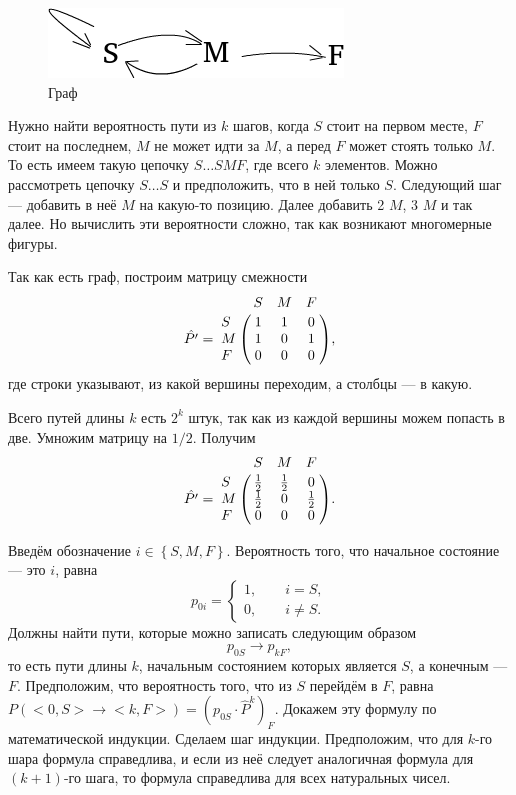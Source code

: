 \begin{figure}[h!]
  \centering
  \includegraphics[width=.6\textwidth]{./pictures/12_15.png}
  \caption{Граф}
  \label{fig:1215}
\end{figure}

Нужно найти вероятность пути из $k$ шагов, когда $S$ стоит на первом месте, $F$ стоит на последнем, $M$ не может идти за $M$, а перед $F$ может стоять только $M$.
То есть имеем такую цепочку $S \dotsc SMF$, где всего $k$ элементов.
Можно рассмотреть цепочку $S \dotsc S$ и предположить, что в ней только $S$.
Следующий шаг --- добавить в неё $M$ на какую-то позицию.
Далее добавить 2 $M$, 3 $M$ и так далее.
Но вычислить эти вероятности сложно, так как возникают многомерные фигуры.

Так как есть граф, построим матрицу смежности
$$ \hat{P'} =
\bordermatrix{~ & S & M & F \cr
              S & 1 & 1 & 0 \cr
              M & 1 & 0 & 1 \cr
	      F & 0 & 0 & 0 \cr },$$
где строки указывают, из какой вершины переходим, а столбцы --- в какую.

Всего путей длины $k$ есть $2^k$ штук, так как из каждой вершины можем попасть в две.
Умножим матрицу на $1/2$.
Получим
$$ \hat{P'} =
\bordermatrix{~ & S & M & F \cr
              S & \frac{1}{2} & \frac{1}{2} & 0 \cr
              M & \frac{1}{2} & 0 & \frac{1}{2} \cr
	      F & 0 & 0 & 0 \cr }.$$

Введём обозначение $i \in \left\{ S, M ,F \right\} $.
Вероятность того, что начальное состояние --- это $i$, равна
$$p_{0i} =
\begin{cases}
1, \qquad i = S, \\
0, \qquad i \neq S.
\end{cases}$$
Должны найти пути,
которые можно записать следующим образом
$$p_{0S} \rightarrow p_{kF},$$
то есть пути длины $k$, начальным состоянием которых является $S$, а конечным --- $F$.
Предположим, что вероятность того, что из $S$ перейдём в $F$, равна $P \left( <0, S> \rightarrow <k, F> \right) = \left( p_{0S} \cdot \hat{P}^k \right)_F$.
Докажем эту формулу по математической индукции.
Сделаем шаг индукции.
Предположим,
что для $k$-го шара формула справедлива,
и если из неё следует аналогичная формула для $ \left( k+1 \right) $-го шага, то формула справедлива для всех натуральных чисел.

